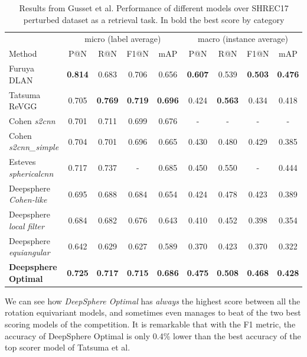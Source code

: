 \begin{table}[h]
	\scriptsize
	\centering
	\begin{tabular}{l|c c c c|c c c c}
		& \multicolumn{4}{c|}{micro (label average)} & \multicolumn{4}{c}{macro (instance average)} \\
		Method & P@N & R@N & F1@N & mAP & P@N & R@N & F1@N & mAP \\ \hline
		Furuya DLAN & \textbf {0.814} & 0.683 & 0.706 & 0.656 &\textbf{0.607} & 0.539 &\textbf  {0.503} & \textbf {0.476} \\
		Tatsuma ReVGG & 0.705 & \textbf{0.769} & \textbf {0.719 }& \textbf {0.696} & 0.424 & \textbf{0.563} & 0.434 & 0.418\\ \hline
		Cohen \emph{s2cnn} & 0.701 & 0.711 & 0.699 & 0.676 & - & - & - & - \\
		Cohen \emph{s2cnn\_simple} & 0.704 & 0.701 & 0.696 & 0.665 & 0.430 & 0.480 & 0.429 & 0.385\\
		Esteves \emph{sphericalcnn} & 0.717 & 0.737 & - & 0.685 & 0.450 & 0.550 & - & 0.444\\
		Deepsphere \emph{Cohen-like} & 0.695 & 0.688 & 0.684 & 0.654 & 0.424 & 0.478 & 0.423 & 0.389\\
		Deepsphere \emph{local filter} & 0.684 & 0.682 & 0.676 & 0.643 & 0.410 & 0.452 & 0.398 & 0.354 \\
		Deepsphere \emph{equiangular} & 0.642 & 0.629 & 0.627 & 0.589 & 0.370 & 0.423 & 0.370 & 0.322 \\
		\textbf{Deepsphere Optimal}& \textbf{0.725} & \textbf{0.717} & \textbf{0.715} & \textbf{0.686} & \textbf{0.475} & \textbf{0.508} & \textbf{0.468} & \textbf{0.428}
	\end{tabular}
	\caption{\label{tab:SHREC17_retriev}Results from Gusset et al. Performance of different models over SHREC17 perturbed dataset as a retrieval task. In bold the best score by category}
\end{table}
We can see how \textit{DeepSphere Optimal} has \textit{always} the highest score between all the rotation equivariant models, and sometimes even manages to beat of the two best scoring models of the competition. It is remarkable that with the F1 metric, the accuracy of DeepSphere Optimal is only 0.4\% lower than the best accuracy of the top scorer model of Tatsuma et al.

